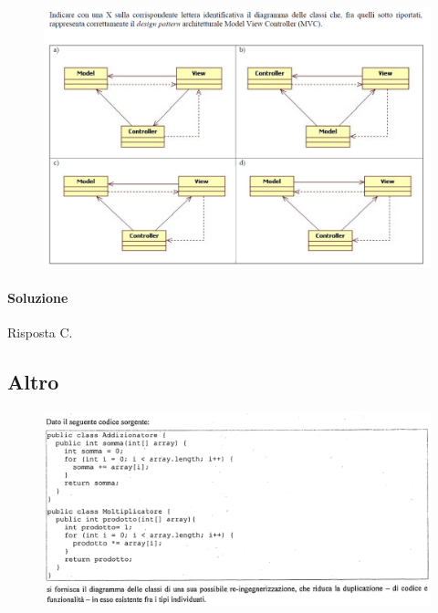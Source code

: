 \begin{figure}[H]\center
\includegraphics[width=1\textwidth]{res/img/Esercizi/es-mvc}
\end{figure}

\paragraph{Soluzione} Risposta C.

\subsection{Altro}
\begin{figure}[H]\center
\includegraphics[width=1\textwidth]{res/img/Esercizi/es-codice}
\end{figure}
